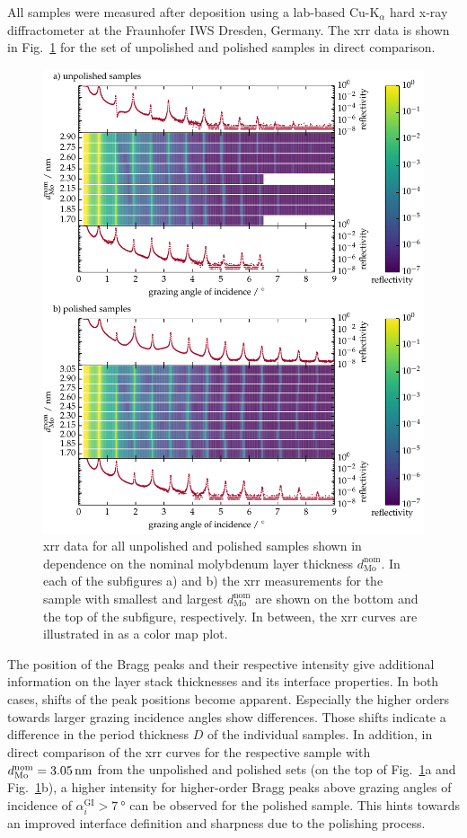 All samples were measured after deposition using a lab-based Cu-K$_\alpha$ hard x-ray diffractometer at the Fraunhofer IWS Dresden, Germany. The \gls{xrr} data is shown in Fig.~\ref{ch_spec:fig_MoSi_XRR} for the set of unpolished and polished samples in direct comparison.
\begin{figure}[htbp]
\centering
\includegraphics[width=\textwidth]{img/XRR_MoSi}
\caption{\gls{xrr} data for all unpolished and polished samples shown in dependence on the nominal molybdenum layer thickness $d_\text{Mo}^\text{nom}$. In each of the subfigures a) and b) the \gls{xrr} measurements for the sample with smallest and largest $d_\text{Mo}^\text{nom}$ are shown on the bottom and the top of the subfigure, respectively. In between, the \gls{xrr} curves are illustrated in as a color map plot.}
\label{ch_spec:fig_MoSi_XRR}
\end{figure}
The position of the Bragg peaks and their respective intensity give additional information on the layer stack thicknesses and its interface properties. In both cases, shifts of the peak positions become apparent. Especially the higher orders towards larger grazing incidence angles show differences. Those shifts indicate a difference in the period thickness $D$ of the individual samples. In addition, in direct comparison of the \gls{xrr} curves for the respective sample with $d_\text{Mo}^\text{nom} = \nm{3.05}$ from the unpolished and polished sets (on the top of Fig.~\ref{ch_spec:fig_MoSi_XRR}a and Fig.~\ref{ch_spec:fig_MoSi_XRR}b), a higher intensity for higher-order Bragg peaks above grazing angles of incidence of $\alpha_i^\text{GI} > \SI{7}{\degree}$ can be observed for the polished sample. This hints towards an improved interface definition and sharpness due to the polishing process.

